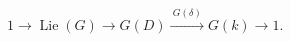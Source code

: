 \(
1\longrightarrow\operatorname{Lie}(G)
\longrightarrow G(D)
\xrightarrow{\ G(\delta)\ }G(k)
\longrightarrow1.
\)
